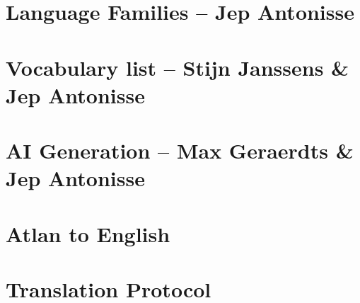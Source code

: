 \setcounter{section}{-1}
\section{Language Families -- {\small Jep Antonisse}}

\section{Vocabulary list -- {\small Stijn Janssens \& Jep Antonisse}}

\section{AI Generation -- {\small Max Geraerdts \& Jep Antonisse}}

\section{Atlan to English}

\section{Translation Protocol}



